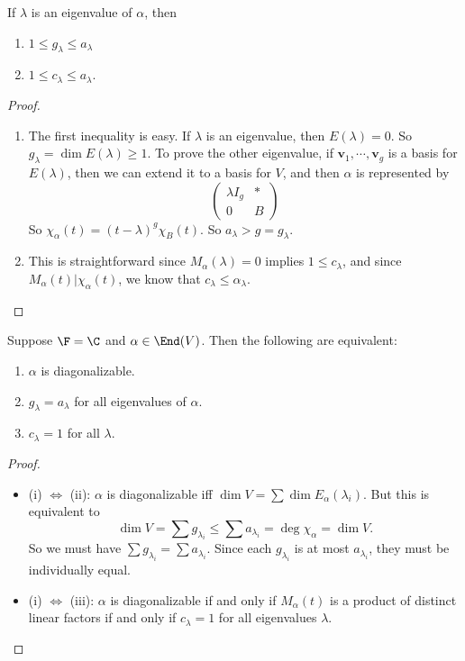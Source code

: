 \documentclass[a4paper]{article}
\begin{document}
\begin{lemma}
  If $\lambda$ is an eigenvalue of $\alpha$, then
  \begin{enumerate}
    \item $1 \leq g_\lambda \leq a_\lambda$
    \item $1 \leq c_\lambda \leq a_\lambda$.
  \end{enumerate}
\end{lemma}
\begin{proof}\leavevmode
  \begin{enumerate}
    \item The first inequality is easy. If $\lambda$ is an eigenvalue, then $E(\lambda) = 0$. So $g_\lambda = \dim E(\lambda) \geq 1$. To prove the other eigenvalue, if $\mathbf{v}_1, \cdots, \mathbf{v}_g$ is a basis for $E(\lambda)$, then we can extend it to a basis for $V$, and then $\alpha$ is represented by
      \[
        \begin{pmatrix}
          \lambda I_g & *\\
          0 & B
        \end{pmatrix}
      \]
      So $\chi_\alpha(t) = (t - \lambda)^g \chi_B(t)$. So $a_\lambda > g = g_\lambda$.
    \item This is straightforward since $M_\alpha(\lambda) = 0$ implies $1 \leq c_\lambda$, and since $M_\alpha(t) | \chi_\alpha(t)$, we know that $c_\lambda \leq \alpha_\lambda$.
  \end{enumerate}
\end{proof}

\begin{lemma}
  Suppose $\F = \C$ and $\alpha \in \End(V)$. Then the following are equivalent:
  \begin{enumerate}
    \item $\alpha$ is diagonalizable.
    \item $g_\lambda = a_\lambda$ for all eigenvalues of $\alpha$.
    \item $c_\lambda = 1$ for all $\lambda$.
  \end{enumerate}
\end{lemma}

\begin{proof}\leavevmode
  \begin{itemize}
    \item (i) $\Leftrightarrow$ (ii): $\alpha$ is diagonalizable iff $\dim V = \sum \dim E_\alpha (\lambda_i)$. But this is equivalent to
      \[
       \dim V = \sum g_{\lambda_i} \leq \sum a_{\lambda_i} = \deg \chi_\alpha = \dim V.
     \]
     So we must have $\sum g_{\lambda_i} = \sum a_{\lambda_i}$. Since each $g_{\lambda_i}$ is at most $a_{\lambda_i}$, they must be individually equal.

   \item (i) $\Leftrightarrow$ (iii): $\alpha$ is diagonalizable if and only if $M_\alpha(t)$ is a product of distinct linear factors if and only if $c_\lambda = 1$ for all eigenvalues $\lambda$.
  \end{itemize}
\end{proof}
\end{document}
